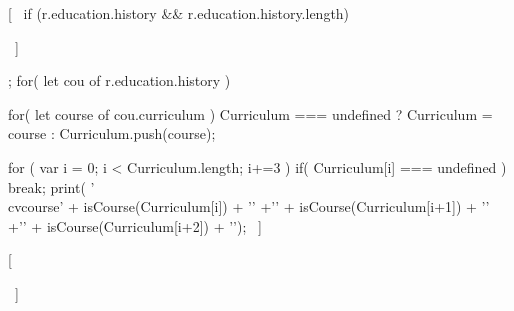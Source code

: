 [~ if (r.education.history && r.education.history.length) 
{ ~]

\begin{cvcourses}
 [~ 
    function isCourse(cou){
      if( cou === undefined || cou === null ){
        return '';
      }
      else{
        return cou;
      }
    }
    var Curriculum=[];
    for( let cou of r.education.history ) { 
      for( let course of cou.curriculum ) {
        Curriculum === undefined ? Curriculum = course : Curriculum.push(course);
      }
   
  } 
  for ( var i = 0; i < Curriculum.length; i+=3 ){ 
    if( Curriculum[i] === undefined )
    {break;}
    print( '\\cvcourse{' + isCourse(Curriculum[i]) + '}'
    +'{' + isCourse(Curriculum[i+1]) + '}'
    +'{' + isCourse(Curriculum[i+2]) + '}\n\n');
  } 
~]
\end{cvcourses}

[~ } ~]
